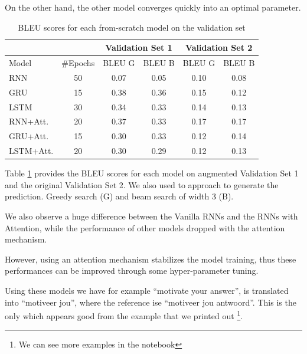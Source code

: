 On the other hand, the other model converges quickly into an optimal parameter.

\begin{table}[H]
	\centering
	\begin{tabular}{lccccc}
		\cmidrule(l){3-6}
		\multicolumn{2}{l}{} & \multicolumn{2}{c}{Validation Set 1} & \multicolumn{2}{c}{Validation Set 2} \\ \midrule
		Model     & \#Epochs & BLEU G          & BLEU B         & BLEU G          & BLEU B         \\ \midrule
		RNN       & 50       & 0.07            & 0.05           & 0.10            & 0.08           \\
		GRU       & 15       & 0.38            & 0.36           & 0.15            & 0.12           \\
		LSTM      & 30       & 0.34            & 0.33           & 0.14            & 0.13           \\
		RNN+Att.  & 20       & 0.37            & 0.33           & 0.17            & 0.17           \\
		GRU+Att.  & 15       & 0.30            & 0.33           & 0.12            & 0.14           \\
		LSTM+Att. & 20       & 0.30            & 0.29           & 0.12            & 0.13           \\ \bottomrule
	\end{tabular}
	\caption{BLEU scores for each from-scratch model on the validation set}
	\label{tab:tab1}
\end{table}

Table \ref{tab:tab1} provides the BLEU scores for each model on augmented Validation Set 1 and the original Validation Set 2. We also used to approach to generate the prediction. Greedy search (G) and beam search of width 3 (B).

We also observe a huge difference between the Vanilla RNNs and the RNNs with Attention, while the performance of other models dropped with the attention mechanism.

However, using an attention mechanism stabilizes the model training, thus these performances can be improved through some hyper-parameter tuning.

Using these models we have for example ``motivate your answer'', is translated into ``motiveer jou'',  where the reference ise ``motiveer jou antwoord''. This is the only which appears good from the example that we printed out \footnote{We can see more examples in the notebook}.


